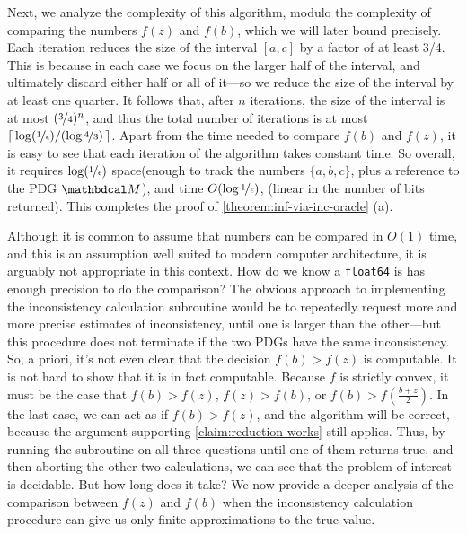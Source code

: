 \begin{lproof}
Next, we analyze the complexity of this algorithm, modulo the
    complexity of comparing the numbers $f(z)$ and $f(b)$, which
    we will later bound precisely.
    Each iteration reduces the size of the interval $[a,c]$
        by a factor of at least 3/4.
    This is because in each case we focus on the larger half of the interval,
        and ultimately discard either half or all of it---so
        we reduce the size of the interval by at least one quarter.
    It follows that, after $n$ iterations,
        the size of the interval is at most $(\nicefrac34)^n$,
    and thus the total number of iterations is at most $\lceil\, \log(\nicefrac{1}{\epsilon}) / (\log \nicefrac43)\,\rceil$.
    Apart from the time needed to compare $f(b)$ and $f(z)$,
    it is easy to see that each iteration of the algorithm takes constant time.
    So overall, it requires
    $\log(\nicefrac1\epsilon)$ space(enough to track the numbers $\{a,b,c\}$, plus a reference to the PDG $\dg M$), and time $O(\log \nicefrac1\epsilon)$, (linear in the number of bits returned).
    This completes the proof of \cref{theorem:inf-via-inc-oracle} (a). 

    Although it is common to assume that numbers can be compared in $O(1)$ time, and this is an assumption well suited to modern computer architecture, it is arguably not appropriate in this context.
    How do we know a \texttt{float64} is has enough precision to do the comparison? 
The obvious approach to implementing the inconsistency calculation subroutine
    would be to repeatedly request more and more precise estimates of inconsistency,
    until one is larger than the other---but this procedure does not terminate if the two PDGs have the same inconsistency. 
    So, a priori, it's not even clear that the decision $f(b) > f(z)$
    is computable.
    It is not hard to show that it is in fact computable.
    Because $f$ is strictly convex,
    it must be the case that $f(b) > f(z)$, $f(z) > f(b)$, or
            $f(b) > f(\frac{b+z}{2})$.  
    In the last case, we can act as if $f(b) > f(z)$, and 
    the algorithm will be correct, because
    the argument supporting \cref{claim:reduction-works} still applies.
    Thus, by running the subroutine on all three questions until one of them
        returns true, and then aborting the other two calculations, we can see that
        the problem of interest is decidable.
    But how long does it take?
    We now provide a deeper analysis of the comparison between $f(z)$ and $f(b)$
    when the inconsistency calculation procedure can give us only finite approximations to the true value. 


\end{lproof}
